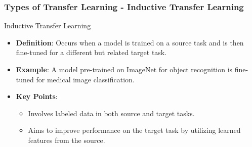 \documentclass[aspectratio=169]{beamer}
\begin{document}
\begin{frame}[fragile]
    \frametitle{Types of Transfer Learning - Inductive Transfer Learning}
    \begin{block}{Inductive Transfer Learning}
        \begin{itemize}
            \item \textbf{Definition}: Occurs when a model is trained on a source task and is then fine-tuned for a different but related target task.
            \item \textbf{Example}: A model pre-trained on ImageNet for object recognition is fine-tuned for medical image classification.
            \item \textbf{Key Points}:
                \begin{itemize}
                    \item Involves labeled data in both source and target tasks.
                    \item Aims to improve performance on the target task by utilizing learned features from the source.
                \end{itemize}
        \end{itemize}
    \end{block}
\end{frame}
\end{document}
